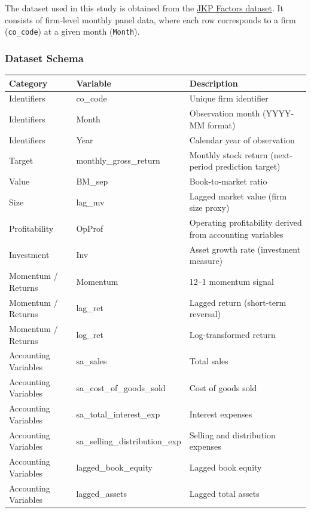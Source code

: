 \documentclass[11pt]{article}
\begin{document}
The dataset used in this study is obtained from the \href{https://jkpfactors.s3.amazonaws.com/documents/Documentation.pdf}{JKP Factors dataset}. It consists of firm-level monthly panel data, where each row corresponds to a firm (\texttt{co\_code}) at a given month (\texttt{Month}).

\subsubsection{Dataset Schema}

\begin{table}[H]
\centering
\small
\begin{tabular}{|l|l|p{7cm}|}
\hline
\textbf{Category} & \textbf{Variable} & \textbf{Description} \\
\hline

Identifiers & co\_code & Unique firm identifier \\
Identifiers & Month & Observation month (YYYY-MM format) \\
Identifiers & Year & Calendar year of observation \\

\hline
Target & monthly\_gross\_return & Monthly stock return (next-period prediction target) \\

\hline
Value & BM\_sep & Book-to-market ratio \\

\hline
Size & lag\_mv & Lagged market value (firm size proxy) \\

\hline
Profitability & OpProf & Operating profitability derived from accounting variables \\

\hline
Investment & Inv & Asset growth rate (investment measure) \\

\hline
Momentum / Returns & Momentum & 12--1 momentum signal \\
Momentum / Returns & lag\_ret & Lagged return (short-term reversal) \\
Momentum / Returns & log\_ret & Log-transformed return \\

\hline
Accounting Variables & sa\_sales & Total sales \\
Accounting Variables & sa\_cost\_of\_goods\_sold & Cost of goods sold \\
Accounting Variables & sa\_total\_interest\_exp & Interest expenses \\
Accounting Variables & sa\_selling\_distribution\_exp & Selling and distribution expenses \\
Accounting Variables & lagged\_book\_equity & Lagged book equity \\
Accounting Variables & lagged\_assets & Lagged total assets \\


\end{tabular}
\end{table}
\end{document}

